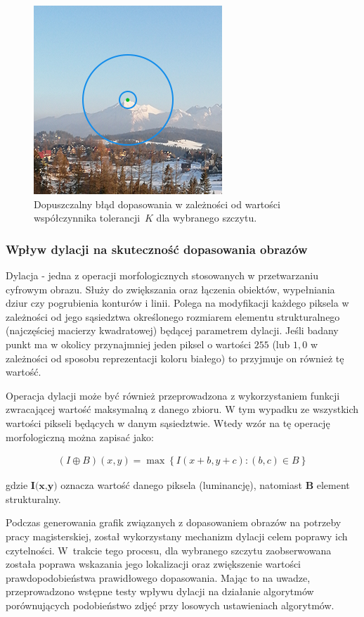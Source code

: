 \begin{figure}[!h]
    \centering \includegraphics[width=0.4\linewidth]{tex/sections/wspolczynnik_K.png}
    \caption{Dopuszczalny błąd dopasowania w zależności od wartości współczynnika tolerancji~$K$ dla wybranego szczytu.}
    \label{fig:wspolczynnik_K}
\end{figure}


\subsubsection{Wpływ dylacji na skuteczność dopasowania obrazów} \label{sec:test_dilation}

Dylacja \cite{dilation} - jedna z operacji morfologicznych stosowanych w przetwarzaniu cyfrowym obrazu. Służy do zwiększania oraz łączenia obiektów, wypełniania dziur czy pogrubienia konturów i linii. Polega na modyfikacji każdego piksela w zależności od jego sąsiedztwa określonego rozmiarem elementu strukturalnego (najczęściej macierzy kwadratowej) będącej parametrem dylacji. Jeśli badany punkt ma w okolicy przynajmniej jeden piksel o wartości $255$ (lub $1,0$ w zależności od sposobu reprezentacji koloru białego) to przyjmuje on również tę wartość. 

Operacja dylacji może być również przeprowadzona z wykorzystaniem funkcji zwracającej wartość maksymalną z danego zbioru. W tym wypadku ze wszystkich wartości pikseli będących w danym sąsiedztwie. Wtedy wzór na tę operację morfologiczną można zapisać jako:

\begin{align*}
     (I \oplus B)(x, y) = \max \left\{ I(x + b, y + c) : (b, c) \in B \right\}
\end{align*}

gdzie $\textbf{I(x,y)}$ oznacza wartość danego piksela (luminancję), natomiast $\textbf{B}$ element strukturalny.

Podczas generowania grafik związanych z dopasowaniem obrazów na potrzeby pracy magisterskiej, został wykorzystany mechanizm dylacji celem poprawy ich czytelności. W~trakcie tego procesu, dla wybranego szczytu zaobserwowana została poprawa wskazania jego lokalizacji oraz zwiększenie wartości prawdopodobieństwa prawidłowego dopasowania. Mając to na uwadze, przeprowadzono wstępne testy wpływu dylacji na działanie algorytmów porównujących podobieństwo zdjęć przy losowych ustawieniach algorytmów. 


